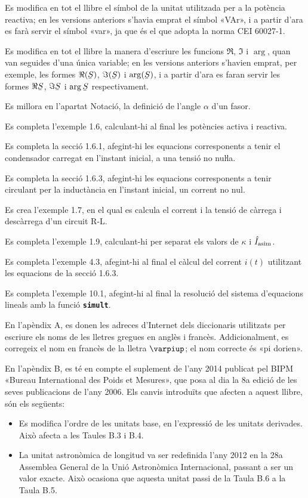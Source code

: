 Es modifica en tot el llibre el símbol de la unitat  utilitzada per a la potència reactiva; en les versions anteriors s'havia emprat el símbol «VAr», i a partir d'ara es farà servir el símbol «var», ja que és el que adopta la norma CEI 60027-1.

Es modifica en tot el llibre la manera d'escriure les funcions $\Re$, $\Im$ i $\arg$, quan van seguides d'una única variable; en les versions anteriors s'havien emprat, per exemple, les formes $\Re(\cmplx{S})$, $\Im(\cmplx{S})$ i $\arg(\cmplx{S})$, i a partir d'ara es faran servir les formes $\Re\cmplx{S}$, $\Im\cmplx{S}$ i $\arg\cmplx{S}$ respectivament.


Es millora en l’apartat Notació, la definició de l’angle $\alpha$ d’un fasor.


Es completa l'exemple 1.6, calculant-hi al final les potències activa i reactiva.

Es completa la secció 1.6.1, afegint-hi les equacions corresponents a tenir el condensador carregat en l'instant inicial, a una tensió no nuŀla.

Es completa la secció 1.6.3, afegint-hi les equacions corresponents a tenir circulant per la inductància en l'instant  inicial, un corrent no nul.

Es crea l'exemple 1.7, en el qual es calcula el corrent i la tensió de càrrega i descàrrega d'un circuit R-L.

Es completa l'exemple 1.9, calculant-hi per separat els valors de $\kappa$ i $\hat{I}_\mathrm{asim}$.


Es completa l'exemple 4.3, afegint-hi al final el càlcul del corrent $i(t)$ utilitzant les equacions de la secció 1.6.3.

Es completa l'exemple 10.1, afegint-hi al final la resolució del sistema d'equacions lineals amb la funció \texttt{\textbf{simult}}.


En l'apèndix A, es donen les adreces d'Internet dels diccionaris utilitzats per escriure els noms de les lletres gregues en anglès i francès. Addicionalment, es corregeix el nom en francès de la lletra $\varpiup$; el nom correcte és «pi dorien».

En l'apèndix B, es té en compte el suplement de l'any 2014 publicat pel BIPM «Bureau International des Poids et Mesures», que posa al dia la 8a edició de les seves publicacions de l'any 2006. Els canvis introduïts que afecten a aquest llibre, són els següents:
\begin{itemize}
  \item Es modifica l'ordre de les unitats base, en l'expressió de les unitats derivades. Això afecta  a les Taules B.3 i B.4.
  \item La unitat astronòmica de longitud va ser redefinida l'any 2012 en la 28a Assemblea General de la Unió Astronòmica Internacional, passant a ser un valor exacte. Això ocasiona que aquesta unitat passi de la Taula B.6  a la Taula  B.5.
\end{itemize}

